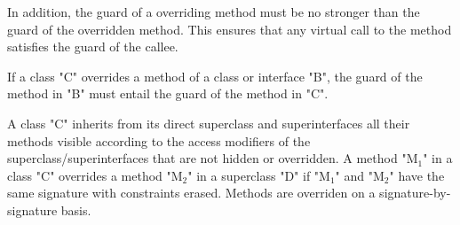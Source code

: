 In addition, the guard of a overriding method must be 
no stronger than the guard of the overridden method.   This
ensures that any virtual call to the method
satisfies the guard of the callee.

\begin{staticrule*}
  If a class \xcd"C" overrides a method of a class or interface
  \xcd"B", the guard of the method in \xcd"B" must entail
  the guard of the method in \xcd"C".
\end{staticrule*}

A class \xcd"C" inherits from its direct superclass and superinterfaces all
their methods visible according to the access modifiers
of the superclass/superinterfaces that are not hidden or overridden. A method \xcdmath"M$_1$" in a class
\xcd"C" overrides
a method \xcdmath"M$_2$" in a superclass \xcd"D" if
\xcdmath"M$_1$" and \xcdmath"M$_2$" have the same signature with constraints erased.
Methods are overriden on a signature-by-signature basis.



